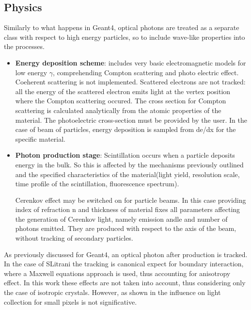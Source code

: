 \subsection{Physics}
Similarly to what happens in Geant4, optical photons are treated as a separate class with respect to high energy particles, so to include wave-like properties into the processes.
\begin{itemize}
\item \textbf{Energy deposition scheme}: includes very basic electromagnetic models for low energy $\gamma$, comprehending Compton scattering and photo electric effect. Coeherent scattering is not implemented. Scattered electrons are not tracked: all the energy of the scattered electron emits light at the vertex position where the Compton scattering occured. 
The cross section for Compton scattering is calculated analytically from the atomic properties of the material.
The photoelectric cross-section must be provided by the user.
In the case of beam of particles, energy deposition is sampled from de/dx for the specific material.
\item \textbf{Photon production stage}: Scintillation occurs when a particle deposits energy in the bulk. So this is affected by the mechanisms previously outlined and the specified characteristics of the material(light yield, resolution scale, time profile of the scintillation, fluorescence spectrum).

Cerenkov effect may be switched on for particle beams. In this case providing index of refraction n and thickness of material fixes all parameters affecting the generation of Cerenkov light, namely emission andle and number of photons emitted. They are produced with respect to the axis of the beam, without tracking of secondary particles.
\end{itemize}
As previously discussed for Geant4, an optical photon after production is tracked. In the case of SLitrani the tracking is canonical expect for boundary interaction, where a Maxwell equations approach is used, thus accounting for anisotropy effect. In this work these effects are not taken into account, thus considering only the case of isotropic crystals. However, as shown in \cite{Cuccia2013} the influence on light collection for small pixels is not significative.
